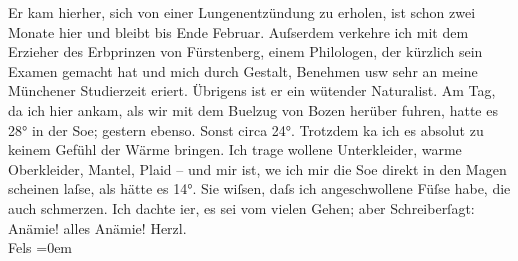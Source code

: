 \begin{ledgroupsized}[t]{13cm}
               Er kam hierher, sich von einer Lungenentzündung zu erholen, ist schon zwei Monate
               hier und bleibt bis Ende Februar. Auſserdem verkehre ich mit dem Erzieher des Erbprinzen von Fürstenberg,
               einem Philologen, der kürzlich sein Examen gemacht hat und mich durch Gestalt,
               Benehmen usw sehr an meine Münchener
               Studierzeit eri{\geminationn}ert. Übrigens ist er ein wütender
               Naturalist.\pend
           \pstart
           Am Tag, da ich hier ankam, als wir mit dem Bu{\geminationm}elzug von
                  Bozen herüber fuhren, hatte es 28° in der
                  So{\geminationn}e; gestern ebenso. Sonst circa 24°. {\pb}Trotzdem ka{\geminationn} ich es
               absolut zu keinem Gefühl der Wärme bringen. Ich trage wollene Unterkleider, warme
               Oberkleider, Mantel, Plaid – und mir ist, we{\geminationn} ich mir
               die So{\geminationn}e direkt in den Magen scheinen laſse, als hätte
               es 14°.\pend
           \pstart
           Sie wiſsen, daſs ich angeschwollene Füſse habe, die auch schmerzen. Ich dachte i{\geminationm}er, es sei vom vielen Gehen; aber Schreiberſagt: Anämie! alles Anämie!\pend
           \pstart
           Herzl. {\\[\baselineskip]}\spacefill\mbox{Fels}\pend
           \leftskip=0em{}
         
         \endnumbering{}\end{ledgroupsized}  \newcommand{\dateiname}{L00177}\newcommand{\titel}{Friedrich M. Fels an Arthur Schnitzler, 1[7]. 2. 1893}\newcommand{\editorInnen}{Martin Anton Müller und Gerd-Hermann Susen}
      